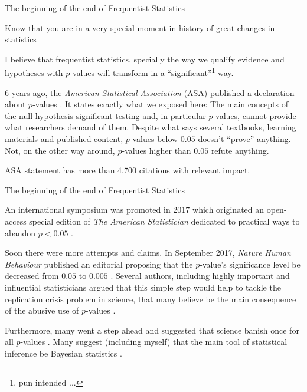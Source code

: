 \begin{frame}{The beginning of the end of Frequentist Statistics}
	\begin{vfilleditems}
		\small
		\item Know that you are in a very special moment in history of great changes in statistics
		\item I believe that frequentist statistics, specially the way we qualify evidence and hypotheses with
		$p$-values will transform in a ``significant''\footnote{pun intended ...} way.
		\item 6 years ago, the \textit{American Statistical Association} (ASA) published a declaration about
		$p$-values \parencite{Wasserstein2016}.
		It states exactly what we exposed here: The main concepts of the null hypothesis significant testing and, in particular $p$-values, cannot provide what researchers demand of them.
		Despite what says several textbooks, learning materials and published content, $p$-values below $0.05$ doesn't ``prove'' anything.
		Not, on the other way around, $p$-values higher than $0.05$ refute anything.
		\item ASA statement has more than 4.700 citations with relevant impact.
	\end{vfilleditems}
\end{frame}

\begin{frame}{The beginning of the end of Frequentist Statistics}
	\begin{vfilleditems}
		\small
		\item An international symposium was promoted in 2017 which originated an open-access special edition of
		\textit{The American Statistician} dedicated to practical ways to abandon $p < 0.05$
		\parencite{wassersteinMovingWorld052019}.
		\item Soon there were more attempts and claims.
		In September 2017, \textit{Nature Human Behaviour} published an editorial proposing that the $p$-value's significance level be decreased from $0.05$ to $0.005$ \parencite{benjaminRedefineStatisticalSignificance2018}.
		Several authors, including highly important and influential statisticians argued that this simple step would help to tackle the replication crisis problem in science, that many believe be the main consequence of the abusive use of $p$-values \parencite{Ioannidis2019}.
		\item Furthermore, many went a step ahead and suggested that science banish once for all $p$-values
		\parencite{ItTimeTalk2019,lakensJustifyYourAlpha2018}.
		Many suggest (including myself) that the main tool of statistical inference be Bayesian statistics \parencite{amrheinScientistsRiseStatistical2019, Goodman1180, vandeschootBayesianStatisticsModelling2021}.
	\end{vfilleditems}
\end{frame}

